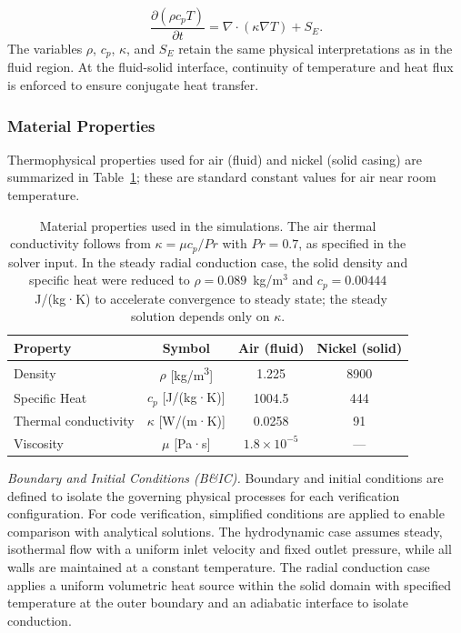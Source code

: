 \begin{equation}\label{eqn:conduction}
   \frac{\partial(\rho c_p T)}{\partial t}  = \nabla \cdot (\kappa \nabla T) + S_E.
\end{equation}
The variables $\rho$, $c_p$, $\kappa$, and $S_E$ retain the same physical interpretations as in the fluid region. At the fluid-solid interface, continuity of temperature and heat flux is enforced to ensure conjugate heat transfer.

\subsubsection*{Material Properties}
\label{subsubsec:material-properties}
Thermophysical properties used for air (fluid) and nickel (solid casing) are summarized in Table~\ref{tab:properties}; these are standard constant values for air near room temperature.

\begin{table}[htbp]
\footnotesize
\setlength{\tabcolsep}{3pt}
\centering
\caption{Material properties used in the simulations. The air thermal conductivity follows from $\kappa = \mu c_p/Pr$ with $Pr = 0.7$, as specified in the solver input. In the steady radial conduction case, the solid density and specific heat were reduced to $\rho = 0.089$~kg/m$^3$ and $c_p = 0.00444$~J/(kg·K) to accelerate convergence to steady state; the steady solution depends only on $\kappa$.}
\label{tab:properties}
\begin{tabular}{lccc}
\toprule
\textbf{Property} & \textbf{Symbol} & \textbf{Air (fluid)} & \textbf{Nickel (solid)} \\
\midrule
Density & \( \rho \) [kg/m\textsuperscript{3}] & 1.225 & 8900 \\
Specific Heat & \( c_p \) [J/(kg·K)] & 1004.5 & 444 \\
Thermal conductivity & \( \kappa \) [W/(m·K)] & 0.0258 & 91 \\
Viscosity & \( \mu \) [Pa·s] & \( 1.8 \times 10^{-5} \) & — \\
\bottomrule
\end{tabular}
\end{table} 
\textit{Boundary and Initial Conditions (B\&IC).}
Boundary and initial conditions are defined to isolate the governing physical processes for each verification configuration. For code verification, simplified conditions are applied to enable comparison with analytical solutions. The hydrodynamic case assumes steady, isothermal flow with a uniform inlet velocity and fixed outlet pressure, while all walls are maintained at a constant temperature. The radial conduction case applies a uniform volumetric heat source within the solid domain with specified temperature at the outer boundary and an adiabatic interface to isolate conduction.

